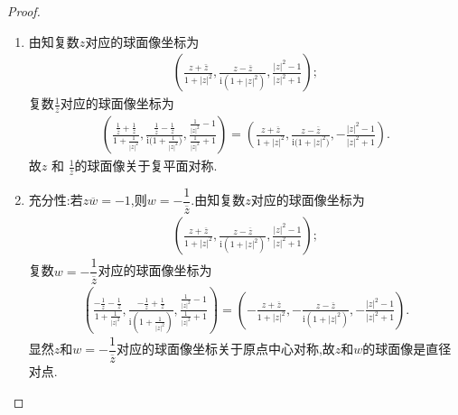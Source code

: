 \documentclass[../../main.tex]{subfiles}%
\begin{document}
\begin{proof}
\begin{enumerate}[(1)]
\item 由知复数$z$对应的球面像坐标为
\begin{align*}
\left( \frac{z+\bar{z}}{1+|z|^2}, \frac{z-\bar{z}}{\mathrm{i}(1+|z|^2)}, \frac{|z|^2-1}{|z|^2+1} \right);
\end{align*}
复数$\frac{1}{\overline{z}}$对应的球面像坐标为
\begin{align*}
\left( \frac{\frac{1}{\overline{z}}+\frac{1}{z}}{1+\frac{1}{\left| z \right|^2}},\frac{\frac{1}{\overline{z}}-\frac{1}{z}}{\mathrm{i(}1+\frac{1}{\left| z \right|^2})},\frac{\frac{1}{\left| z \right|^2}-1}{\frac{1}{\left| z \right|^2}+1} \right) =\left( \frac{z+\overline{z}}{1+\left| z \right|^2},\frac{z-\overline{z}}{\mathrm{i(}1+\left| z \right|^2)},-\frac{\left| z \right|^2-1}{\left| z \right|^2+1} \right) .
\end{align*}
故$z$ 和 $\frac{1}{\overline{z}}$的球面像关于复平面对称.

\item {\heiti 充分性:}若$z\overline{w}=-1$,则$w=-\dfrac{1}{\overline{z}}$.由知复数$z$对应的球面像坐标为
\begin{align*}
\left( \frac{z+\overline{z}}{1+|z|^2},\frac{z-\overline{z}}{\mathrm{i}\left( 1+|z|^2 \right)},\frac{|z|^2-1}{|z|^2+1} \right) ;
\end{align*}
复数$w=-\dfrac{1}{\overline{z}}$对应的球面像坐标为
\begin{align*}
\left( \frac{-\frac{1}{\overline{z}}-\frac{1}{z}}{1+\frac{1}{\left| z \right|^2}},\frac{-\frac{1}{\overline{z}}+\frac{1}{z}}{\mathrm{i}\left( 1+\frac{1}{\left| z \right|^2} \right)},\frac{\frac{1}{\left| z \right|^2}-1}{\frac{1}{\left| z \right|^2}+1} \right) =\left( -\frac{z+\overline{z}}{1+\left| z \right|^2},-\frac{z-\overline{z}}{\mathrm{i}(1+\left| z \right|^2)},-\frac{\left| z \right|^2-1}{\left| z \right|^2+1} \right) .
\end{align*}
显然$z$和$w=-\dfrac{1}{\overline{z}}$对应的球面像坐标关于原点中心对称,故$z$和$w$的球面像是直径对点.


\end{enumerate}
\end{proof}
\end{document}
